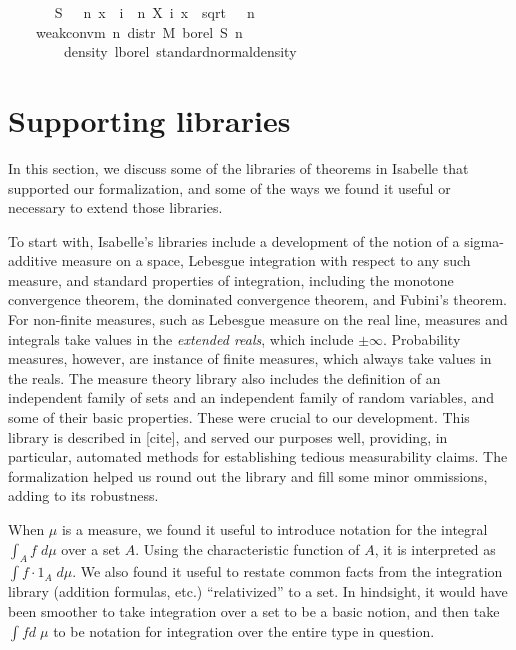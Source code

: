 \documentclass{article}
\begin{document}
\begin{isabellebody}
\ \ \isanewline
\ \ \ \ {\isachardoublequoteopen}S\ {\isasymequiv}\ {\isacharparenleft}{\isasymlambda}\ n\ x{\isachardot}\ {\isacharparenleft}{\isasymSum}\ i\ {\isacharless}\ n{\isachardot}\ X\ i\ x{\isacharparenright}\ {\isacharslash}\ sqrt\ {\isacharparenleft}{\isasymsigma}{}\ {\isacharasterisk}\ n{\isacharparenright}{\isacharparenright}{\isachardoublequoteclose}\isanewline
\ \ \isanewline
\ \ \ \ {\isachardoublequoteopen}weak{\isacharunderscore}conv{\isacharunderscore}m\ {\isacharparenleft}{\isasymlambda}n{\isachardot}\ distr\ M\ borel\ {\isacharparenleft}S\ n{\isacharparenright}{\isacharparenright}\isanewline
\ \ \ \ \ \ \ \ {\isacharparenleft}density\ lborel\ standard{\isacharunderscore}normal{\isacharunderscore}density{\isacharparenright}{\isachardoublequoteclose}\isanewline 
\end{isabellebody}


\section{Supporting libraries}

In this section, we discuss some of the libraries of theorems in Isabelle that supported our formalization, and some of the ways we found it useful or necessary to extend those libraries. 

To start with, Isabelle's libraries include a development of the notion of a sigma-additive measure on a space, Lebesgue integration with respect to any such measure, and standard properties of integration, including the monotone convergence theorem, the dominated convergence theorem, and Fubini's theorem. For non-finite measures, such as Lebesgue measure on the real line, measures and integrals take values in the \emph{extended reals}, which include $\pm \infty$. Probability measures, however, are instance of finite measures, which always take values in the reals. The measure theory library also includes the definition of an independent family of sets and an independent family of random variables, and some of their basic properties. These were crucial to our development.  This library is described in [cite], and served our purposes well, providing, in particular, automated methods for establishing tedious measurability claims. The formalization helped us round out the library and fill some minor ommissions, adding to its robustness.

When $\mu$ is a measure,  we found it useful to introduce notation for the integral $\int_A f \; d\mu$ over a set $A$. Using the characteristic function of $A$, it is interpreted as $\int f \cdot 1_A \; d\mu$. We also found it useful to restate common facts from the integration library (addition formulas, etc.) ``relativized'' to a set. In hindsight, it would have been smoother to take integration over a set to be a basic notion, and then take $\int f d\;\mu$ to be notation for integration over the entire type in question.
\end{document}
